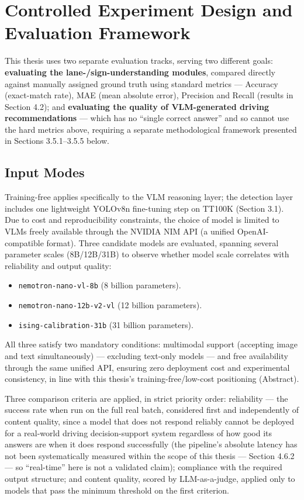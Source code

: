 \documentclass[12pt,a4paper]{report}
\begin{document}
\section{Controlled Experiment Design and Evaluation Framework}

This thesis uses two separate evaluation tracks, serving two different goals: \textbf{evaluating the lane-/sign-understanding modules}, compared directly against manually assigned ground truth using standard metrics --- Accuracy (exact-match rate), MAE (mean absolute error), Precision and Recall (results in Section 4.2); and \textbf{evaluating the quality of VLM-generated driving recommendations} --- which has no ``single correct answer'' and so cannot use the hard metrics above, requiring a separate methodological framework presented in Sections 3.5.1--3.5.5 below.

\subsection{Input Modes}

Training-free applies specifically to the VLM reasoning layer; the detection layer includes one lightweight YOLOv8n fine-tuning step on TT100K (Section 3.1). Due to cost and reproducibility constraints, the choice of model is limited to VLMs freely available through the NVIDIA NIM API (a unified OpenAI-compatible format). Three candidate models are evaluated, spanning several parameter scales (8B/12B/31B) to observe whether model scale correlates with reliability and output quality:

\begin{itemize}
    \item \texttt{nemotron-nano-vl-8b} (8 billion parameters).
    \item \texttt{nemotron-nano-12b-v2-vl} (12 billion parameters).
    \item \texttt{ising-calibration-31b} (31 billion parameters).
\end{itemize}

All three satisfy two mandatory conditions: multimodal support (accepting image and text simultaneously) --- excluding text-only models --- and free availability through the same unified API, ensuring zero deployment cost and experimental consistency, in line with this thesis's training-free/low-cost positioning (Abstract).

Three comparison criteria are applied, in strict priority order: reliability --- the success rate when run on the full real batch, considered first and independently of content quality, since a model that does not respond reliably cannot be deployed for a real-world driving decision-support system regardless of how good its answers are when it does respond successfully (the pipeline's absolute latency has not been systematically measured within the scope of this thesis --- Section 4.6.2 --- so ``real-time'' here is not a validated claim); compliance with the required output structure; and content quality, scored by LLM-as-a-judge, applied only to models that pass the minimum threshold on the first criterion.
\end{document}

